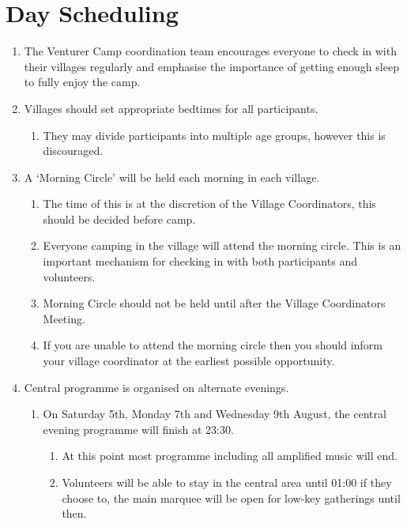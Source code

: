 \documentclass[a4paper, 11pt]{report}
\def\enumMarginIndentOne{4em}
\def\enumMarginIndentTwo{5em}
\begin{document}
    \chapter{Day Scheduling}
    \begin{enumerate}
        \item The Venturer Camp coordination team encourages everyone to check in with their villages regularly and emphasise the importance of getting enough sleep to fully enjoy the camp.
        \item Villages should set appropriate bedtimes for all participants.
        \begin{enumerate}[leftmargin=\enumMarginIndentOne]
            \item They may divide participants into multiple age groups, however this is discouraged.
        \end{enumerate}
        \item A `Morning Circle' will be held each morning in each village.
        \begin{enumerate}[leftmargin=\enumMarginIndentOne]
            \item The time of this is at the discretion of the Village Coordinators, this should be decided before camp.
            \item Everyone camping in the village will attend the morning circle. This is an important mechanism for checking in with both participants and volunteers.
            \item Morning Circle should not be held until after the Village Coordinators Meeting.
            \item If you are unable to attend the morning circle then you should inform your village coordinator at the earliest possible opportunity. 
        \end{enumerate}
        \item Central programme is organised on alternate evenings.
        \begin{enumerate}[leftmargin=\enumMarginIndentOne]
            \item On Saturday 5th, Monday 7th and Wednesday 9th August, the central evening programme will finish at 23:30.
            \begin{enumerate}[leftmargin=\enumMarginIndentTwo]
                \item At this point most programme including all amplified music will end.
                \item Volunteers will be able to stay in the central area until 01:00 if they choose to, the main marquee will be open for low-key gatherings until then.

\end{enumerate}
\end{enumerate}
\end{enumerate}
\end{document}
